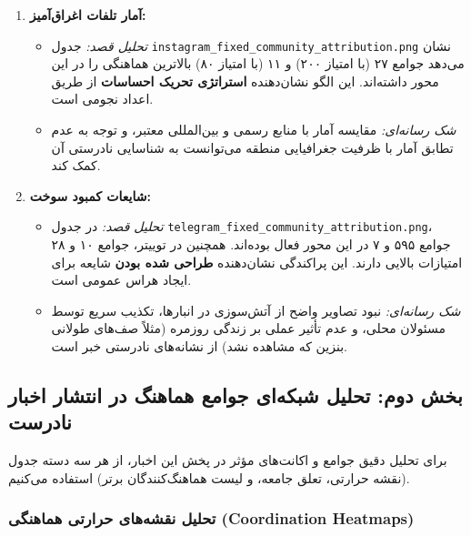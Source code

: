 \documentclass{article}
\begin{document}
\begin{enumerate}
		\item \textbf{آمار تلفات اغراق‌آمیز:}
		\begin{itemize}
			\item \textit{تحلیل قصد:} جدول \texttt{instagram\_fixed\_community\_attribution.png} نشان می‌دهد جوامع ۲۷ (با امتیاز ۲۰۰) و ۱۱ (با امتیاز ۸۰) بالاترین هماهنگی را در این محور داشته‌اند. این الگو نشان‌دهنده \textbf{استراتژی تحریک احساسات} از طریق اعداد نجومی است.
			\item \textit{شک رسانه‌ای:} مقایسه آمار با منابع رسمی و بین‌المللی معتبر، و توجه به عدم تطابق آمار با ظرفیت جغرافیایی منطقه می‌توانست به شناسایی نادرستی آن کمک کند.
		\end{itemize}
		
		\item \textbf{شایعات کمبود سوخت:}
		\begin{itemize}
			\item \textit{تحلیل قصد:} در جدول \texttt{telegram\_fixed\_community\_attribution.png}، جوامع ۵۹۵ و ۷ در این محور فعال بوده‌اند. همچنین در توییتر، جوامع ۱۰ و ۲۸ امتیازات بالایی دارند. این پراکندگی نشان‌دهنده \textbf{طراحی شده بودن} شایعه برای ایجاد هراس عمومی است.
			\item \textit{شک رسانه‌ای:} نبود تصاویر واضح از آتش‌سوزی در انبارها، تکذیب سریع توسط مسئولان محلی، و عدم تأثیر عملی بر زندگی روزمره (مثلاً صف‌های طولانی بنزین که مشاهده نشد) از نشانه‌های نادرستی خبر است.
		\end{itemize}
	\end{enumerate}
	
	\subsection*{بخش دوم: تحلیل شبکه‌ای جوامع هماهنگ در انتشار اخبار نادرست}
	
	برای تحلیل دقیق جوامع و اکانت‌های مؤثر در پخش این اخبار، از هر سه دسته جدول (نقشه حرارتی، تعلق جامعه، و لیست هماهنگ‌کنندگان برتر) استفاده می‌کنیم.
	
	\subsubsection*{تحلیل نقشه‌های حرارتی هماهنگی (Coordination Heatmaps)}
	
\end{document}

